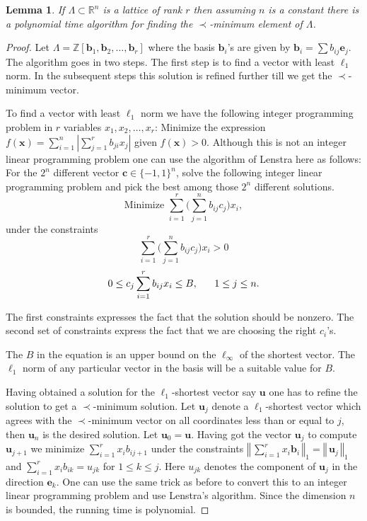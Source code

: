 \documentclass{article}
\newtheorem{lemma}[theorem]{Lemma}
\theoremstyle{definition}\newtheorem{remark}[theorem]{Remark}
\newcommand {\norm} [1] {\ensuremath {\left\Vert\,#1\,\right\Vert}}
\renewcommand{\vector}[1]{\ensuremath{\mathbf{#1}}}
\begin{document}
\begin{lemma}\label{lem-prec-min-vector}
  If $\Lambda \subset \mathbb{R}^n$ is a lattice of rank $r$ then
  assuming $n$ is a constant there is a polynomial time algorithm for
  finding the $\prec$-minimum element of $\Lambda$.
\end{lemma}
\begin{proof}
  Let $\Lambda =
  \mathbb{Z}[\vector{b}_1,\vector{b}_2,\ldots,\vector{b}_r]$ where the
  basis $\vector{b}_i$'s are given by $\vector{b}_i = \sum b_{ij}
  \vector{e}_j$. The algorithm goes in two steps. The first step is to
  find a vector with least $\ell_1$ norm. In the subsequent steps this
  solution is refined further till we get the $\prec$-minimum vector.
  
  To find a vector with least $\ell_1$ norm we have the following integer
  programming problem in $r$ variables $x_1,x_2,\ldots , x_r$:
  Minimize the expression $f(\vector{x}) = \sum_{i=1}^n |\sum_{j=1}^r
  b_{ji} x_j |$ given $f(\vector{x}) > 0$. Although this is not an
  integer linear programming problem one can use the algorithm of
  Lenstra here as follows: For the $2^n$ different vector $\vector{c}
  \in \{-1,1\}^n$, solve the following integer linear programming
  problem and pick the best among those $2^n$ different solutions.
  \[
  \textrm{Minimize } \sum_{i=1}^r \biggl(\sum_{j=1}^n b_{ij} c_j\biggr) x_i,
  \] 
  under the constraints
 \begin{equation}
   \sum_{i=1}^r \biggl(\sum_{j=1}^n b_{ij} c_j\biggr) x_i  >  0 
 \end{equation}
\begin{equation}
0  \leq  c_j  \sum_{i=1}^r b_{ij} x_i  \leq  B,\hbox{~~~~~} 1\leq j\leq n. 
\end{equation}
  
  The first constraints expresses the fact that the solution should be
  nonzero.  The second set of constraints express the fact that we are
  choosing the right $c_i$'s.
  
  The $B$ in the equation is an upper bound on the $\ell_\infty$ of the
  shortest vector. The $\ell_1$ norm of any particular vector in the
  basis will be a suitable value for $B$.
  
  Having obtained a solution for the $\ell_1$-shortest vector say
  $\vector{u}$ one has to refine the solution to get a $\prec$-minimum
  solution.  Let $\vector{u}_j$ denote a $\ell_1$-shortest vector which
  agrees with the $\prec$-minimum vector on all coordinates less than
  or equal to $j$, then $\vector{u}_n$ is the desired solution. Let
  $\vector{u}_0 = \vector{u}$.  Having got the vector $\vector{u}_j$
  to compute $\vector{u}_{j+1}$ we minimize $\sum_{i=1}^r x_i b_{ij+1}$ under
  the constraints $\norm{\sum_{i=1}^r x_i \vector{b}_i}_1 =
  \norm{\vector{u}_j}_1$ and $\sum_{i=1}^r x_i b_{ik} = u_{jk}$ for $1
  \leq k \leq j$. Here $u_{jk}$ denotes the component of
  $\vector{u}_j$ in the direction $\vector{e}_k$. One can use the same
  trick as before to convert this to an integer linear programming
  problem and use Lenstra's algorithm. Since the dimension $n$ is
  bounded, the running time is polynomial.
\end{proof}
\end{document}
